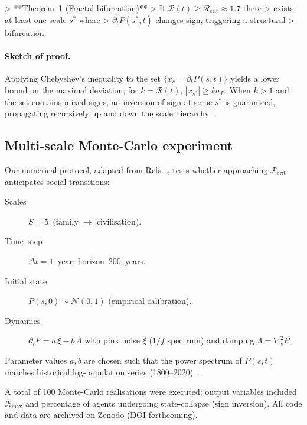 > **Theorem 1 (Fractal bifurcation)**  
> If $\mathcal{R}(t)\ge\mathcal{R}_{\text{crit}}\!\approx\!1.7$ there
> exists at least one scale $s^{\ast}$ where
> $\partial_{t}P(s^{\ast},t)$ changes sign, triggering a structural
> bifurcation. 

\paragraph{Sketch of proof.}
Applying Chebyshev’s inequality to the set
$\{x_{s}=\partial_{t}P(s,t)\}$ yields a lower bound on the maximal
deviation; for $k\!=\!\mathcal{R}(t)$,  
$|x_{s^{\ast}}|\ge k\sigma_{P}$. When $k>1$
and the set contains mixed signs, an inversion of sign at some
$s^{\ast}$ is guaranteed, propagating recursively up and down the scale
hierarchy .

\subsection{Multi‑scale Monte‑Carlo experiment}

Our numerical protocol, adapted from
Refs.~\citep{turchin2003,newman2010}, tests whether approaching
$\mathcal{R}_{\text{crit}}$ anticipates social transitions:

\begin{description}
  \item[Scales] $S=5$ (family $\rightarrow$ civilisation).  
  \item[Time step] $\Delta t = 1$ year; horizon 200 years.  
  \item[Initial state] $P(s,0)\sim\mathcal{N}(0,1)$ (empirical calibration).  
  \item[Dynamics]
    $\partial_{t}P = a\,\xi - b\,\Lambda$  
    with pink noise $\xi$ ($1/f$ spectrum) and damping
    $\Lambda=\nabla^{2}_{s}P$.
\end{description}

Parameter values $a,b$ are chosen such that the power spectrum of
$P(s,t)$ matches historical log‑population series
(1800–2020) .

A total of 100 Monte‑Carlo realisations were executed; output variables
included $\mathcal{R}_{\max}$ and percentage of agents undergoing
state‑collapse (sign inversion).  All code and data are archived on
Zenodo (DOI forthcoming).

